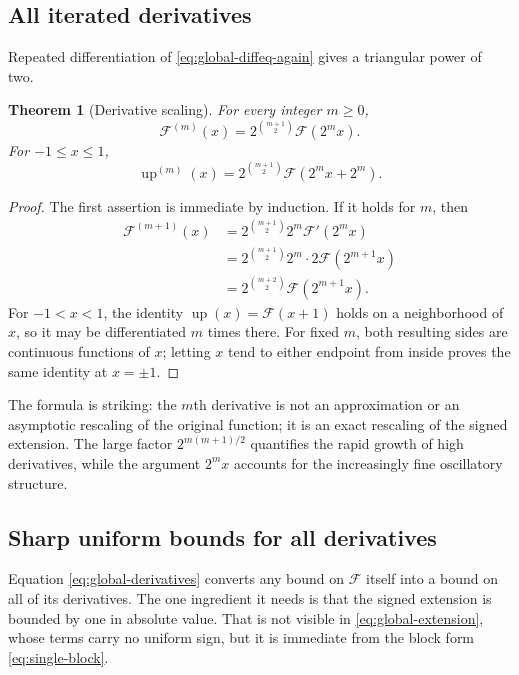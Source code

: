 \documentclass[11pt,oneside]{article}
\newtheorem{theorem}{Theorem}[section]
\theoremstyle{definition}
\theoremstyle{remark}
\newcommand{\Up}{\operatorname{up}}
\begin{document}
\subsection{All iterated derivatives}

Repeated differentiation of \eqref{eq:global-diffeq-again} gives a triangular power of two.

\begin{theorem}[Derivative scaling]
For every integer $m\ge0$,
\begin{equation}
 \mathcal F^{(m)}(x)=2^{\binom{m+1}{2}}\mathcal F(2^m x).   \label{eq:global-derivatives}
\end{equation}
For $-1\le x\le1$,
\begin{equation}
 \Up^{(m)}(x)=2^{\binom{m+1}{2}}
   \mathcal F(2^m x+2^m).                                 \label{eq:up-derivatives}
\end{equation}
\end{theorem}

\begin{proof}
The first assertion is immediate by induction.  If it holds for $m$, then
\begin{align*}
 \mathcal F^{(m+1)}(x)
 &=2^{\binom{m+1}{2}}2^m\mathcal F'(2^m x)\\
 &=2^{\binom{m+1}{2}}2^m\cdot2\mathcal F(2^{m+1}x)\\
 &=2^{\binom{m+2}{2}}\mathcal F(2^{m+1}x).
\end{align*}
For $-1<x<1$, the identity $\Up(x)=\mathcal F(x+1)$ holds on a neighborhood of $x$, so it
may be differentiated $m$ times there.  For fixed $m$, both resulting sides are continuous
functions of $x$; letting $x$ tend to either endpoint from inside proves the same identity
at $x=\pm1$.
\end{proof}

The formula is striking: the $m$th derivative is not an approximation or an asymptotic
rescaling of the original function; it is an exact rescaling of the signed extension.  The
large factor $2^{m(m+1)/2}$ quantifies the rapid growth of high derivatives, while the
argument $2^m x$ accounts for the increasingly fine oscillatory structure.

\subsection{Sharp uniform bounds for all derivatives}
\label{shape:derivative-bounds}

Equation \eqref{eq:global-derivatives} converts any bound on $\mathcal F$ itself into a bound
on all of its derivatives.  The one ingredient it needs is that the signed extension is
bounded by one in absolute value.  That is not visible in \eqref{eq:global-extension}, whose
terms carry no uniform sign, but it is immediate from the block form \eqref{eq:single-block}.
\end{document}
